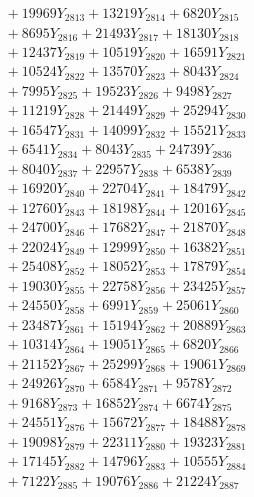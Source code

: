 \documentclass[a4paper,10pt]{article}
\begin{document}
{\begin{align}
&\;  + 19969 Y_{2813} + 13219 Y_{2814} + 6820 Y_{2815} \\[0.3ex]
&\;  + 8695 Y_{2816} + 21493 Y_{2817} + 18130 Y_{2818} \\[0.5ex]\allowbreak
&\;  + 12437 Y_{2819} + 10519 Y_{2820} + 16591 Y_{2821} \\[0.3ex]
&\;  + 10524 Y_{2822} + 13570 Y_{2823} + 8043 Y_{2824} \\[0.3ex]
&\;  + 7995 Y_{2825} + 19523 Y_{2826} + 9498 Y_{2827} \\[0.3ex]
&\;  + 11219 Y_{2828} + 21449 Y_{2829} + 25294 Y_{2830} \\[0.3ex]
&\;  + 16547 Y_{2831} + 14099 Y_{2832} + 15521 Y_{2833} \\[0.3ex]
&\;  + 6541 Y_{2834} + 8043 Y_{2835} + 24739 Y_{2836} \\[0.3ex]
&\;  + 8040 Y_{2837} + 22957 Y_{2838} + 6538 Y_{2839} \\[0.3ex]
&\;  + 16920 Y_{2840} + 22704 Y_{2841} + 18479 Y_{2842} \\[0.3ex]
&\;  + 12760 Y_{2843} + 18198 Y_{2844} + 12016 Y_{2845} \\[0.3ex]
&\;  + 24700 Y_{2846} + 17682 Y_{2847} + 21870 Y_{2848} \\[0.5ex]\allowbreak
&\;  + 22024 Y_{2849} + 12999 Y_{2850} + 16382 Y_{2851} \\[0.3ex]
&\;  + 25408 Y_{2852} + 18052 Y_{2853} + 17879 Y_{2854} \\[0.3ex]
&\;  + 19030 Y_{2855} + 22758 Y_{2856} + 23425 Y_{2857} \\[0.3ex]
&\;  + 24550 Y_{2858} + 6991 Y_{2859} + 25061 Y_{2860} \\[0.3ex]
&\;  + 23487 Y_{2861} + 15194 Y_{2862} + 20889 Y_{2863} \\[0.3ex]
&\;  + 10314 Y_{2864} + 19051 Y_{2865} + 6820 Y_{2866} \\[0.3ex]
&\;  + 21152 Y_{2867} + 25299 Y_{2868} + 19061 Y_{2869} \\[0.3ex]
&\;  + 24926 Y_{2870} + 6584 Y_{2871} + 9578 Y_{2872} \\[0.3ex]
&\;  + 9168 Y_{2873} + 16852 Y_{2874} + 6674 Y_{2875} \\[0.3ex]
&\;  + 24551 Y_{2876} + 15672 Y_{2877} + 18488 Y_{2878} \\[0.5ex]\allowbreak
&\;  + 19098 Y_{2879} + 22311 Y_{2880} + 19323 Y_{2881} \\[0.3ex]
&\;  + 17145 Y_{2882} + 14796 Y_{2883} + 10555 Y_{2884} \\[0.3ex]
&\;  + 7122 Y_{2885} + 19076 Y_{2886} + 21224 Y_{2887} \\[0.3ex]

\end{align}}
\end{document}
